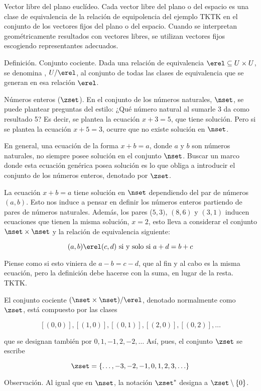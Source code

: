\begin{example}
  Vector libre del plano euclídeo. Cada vector libre del plano o del espacio
  es una clase de equivalencia de la relación de equipolencia del ejemplo
  TKTK en el conjunto de los vectores fijos del plano o del espacio. Cuando
  se interpretan geométricamente resultados con vectores libres, se utilizan
  vectores fijos escogiendo representantes adecuados.
\end{example}

Definición. Conjunto cociente. Dada una relación de equivalencia $\erel
\subseteq U \times U$, se denomina , $U/\erel$, al
conjunto de todas las clases de equivalencia que se generan en esa relación
$\erel$.

\begin{example}
  Números enteros ($\zset$). En el conjunto de los números naturales,
  $\nset$, se puede plantear preguntas del estilo: ¿Qué número natural al
  sumarle 3 da como resultado 5? Es decir, se plantea la ecuación $x + 3 =
  5$, que tiene solución. Pero si se plantea la ecuación $x + 5 = 3$, ocurre
  que no existe solución en $\nset$.

  En general, una ecuación de la forma $x + b = a$, donde $a$ y $b$ son
  números naturales, no siempre posee solución en el conjunto $\nset$.
  Buscar un marco donde esta ecuación genérica posea solución es lo que
  obliga a introducir el conjunto de los números enteros, denotado por
  $\zset$.

  La ecuación $x + b = a$ tiene solución en $\nset$ dependiendo del par de
  números $(a, b)$. Esto nos induce a pensar en definir los números enteros
  partiendo de pares de números naturales. Además, los pares ($5, 3)$, $(8,
  6)$ y $(3, 1)$ inducen ecuaciones que tienen la misma solución, $x = 2$,
  esto lleva a considerar el conjunto $\nset \times \nset$ y la relación de
  equivalencia siguiente:

  \[ (a, b) \erel (c, d) \ \text{si y solo si} \ a + d = b + c \]

  \noindent Piense como si esto viniera de $a - b = c - d$, que al fin y al
  cabo es la misma ecuación, pero la definición debe hacerse con la suma, en
  lugar de la resta. TKTK.

  El conjunto cociente $(\nset \times \nset)/\erel$, denotado normalmente
  como $\zset$, está compuesto por las clases

  \[ [(0, 0)], [(1, 0)], [(0, 1)], [(2, 0)], [(0, 2)], \ldots \]

  \noindent que se designan también por $0, 1, {-1}, 2, {-2}, \ldots$ Así,
  pues, el conjunto $\zset$ se escribe

  \[ \zset = \{\ldots, {-3}, {-2}, {-1}, 0, 1, 2, 3, \ldots\} \]

  Observación. Al igual que en $\nset$, la notación $\zset^*$ designa a
  $\zset \setminus \{0\}$.
\end{example}

